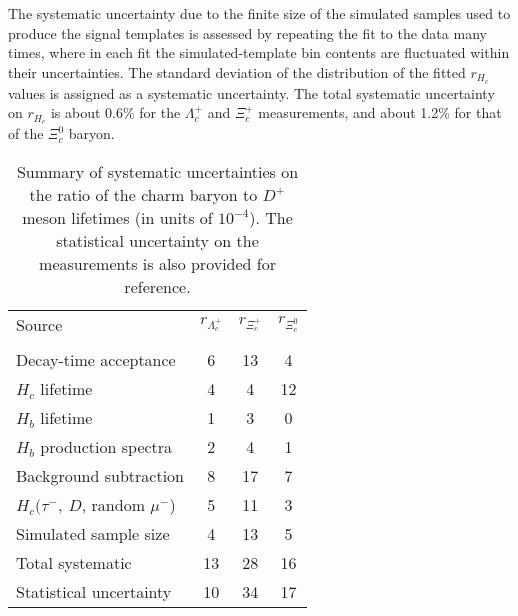 \documentclass[12pt,a4paper]{article}
\def\Pmu         {\ensuremath{\upmu}\xspace}
\def\Ptau        {\ensuremath{\uptau}\xspace}
\def\PXi         {\ensuremath{\Xi}\xspace}
\def\PLambda     {\ensuremath{\Lambda}\xspace}
\def\PD      {\ensuremath{\mathrm{D}}\xspace}
\def\Pc      {\ensuremath{\mathrm{c}}\xspace}
\def\Pmu         {\ensuremath{\mu}\xspace}
\def\Ptau        {\ensuremath{\tau}\xspace}
\def\PD      {\ensuremath{D}\xspace}
\def\Pc      {\ensuremath{c}\xspace}
\def\mun        {{\ensuremath{\Pmu^-}}\xspace} \def\mupm       {{\ensuremath{\Pmu^\pm}}\xspace}
\def\taum       {{\ensuremath{\Ptau^-}}\xspace}
\def\cquark    {{\ensuremath{\Pc}}\xspace}
\def\D       {{\ensuremath{\PD}}\xspace}
\def\Dp      {{\ensuremath{\D^+}}\xspace}
\def\Lz          {{\ensuremath{\PLambda}}\xspace}
\def\Xires       {{\ensuremath{\PXi}}\xspace}
\def\Lc          {{\ensuremath{\Lz^+_\cquark}}\xspace}
\def\Xicz        {{\ensuremath{\Xires^0_\cquark}}\xspace}
\def\Xicp        {{\ensuremath{\Xires^+_\cquark}}\xspace}
\begin{document}
The systematic uncertainty due to the finite size of the simulated samples used to produce the signal templates
is assessed by repeating the fit to the data many times, where in each fit the
simulated-template bin contents are fluctuated within their uncertainties. The standard deviation of the distribution of the
fitted $r_{H_c}$ values is assigned as a systematic uncertainty.  The total systematic uncertainty on $r_{H_c}$ is about 0.6\% for
the $\Lc$ and $\Xicp$ measurements, and about 1.2\% for that of the $\Xicz$ baryon.

\begin{table*}[tb]
\begin{center}
\caption{\small{Summary of systematic uncertainties on the ratio of the charm baryon to $\Dp$ meson lifetimes (in units of $10^{-4}$).
The statistical uncertainty on the measurements is also provided for reference.}}
\begin{tabular}{lccc}
\hline\hline
Source                         & $r_{\Lc}$ & $r_{\Xicp}$ & $r_{\Xicz}$ \\
\\ [-2.5ex]
\hline          
Decay-time acceptance                     &   6     &      13      &      4         \\
$H_c$ lifetime                            &   4     &       4      &      12         \\
$H_b$ lifetime                            &   1      &      3      &      0         \\
$H_b$ production spectra                  &    2     &      4      &      1         \\
Background subtraction                    &    8     &      17     &      7         \\
$H_c(\taum,~D$, random $\mun$)            &    5     &      11     &      3         \\
Simulated sample size                     &    4     &      13     &       5        \\
\hline
Total systematic                          &    13     &     28     &     16      \\
\hline
Statistical uncertainty                   &    10     &     34     &     17        \\
\hline\hline
\end{tabular}
\label{tab:CharmSyst}
\end{center}
\end{table*}
\end{document}
